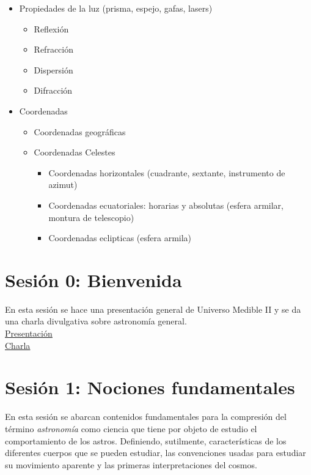 \documentclass[10pt,a4paper]{article}
\begin{document}
\begin{itemize}
\begin{itemize}
 \end{itemize}
\item Propiedades de la luz (prisma, espejo, gafas, lasers)
 \begin{itemize}
 \item Reflexión
 \item Refracción
 \item Dispersión 
 \item Difracción 
 \end{itemize}
\item Coordenadas 
 \begin{itemize}
  \item Coordenadas geográficas 
  \item Coordenadas Celestes
   \begin{itemize}
    \item Coordenadas horizontales (cuadrante, sextante, instrumento de azimut)
    \item Coordenadas ecuatoriales: horarias y absolutas (esfera armilar, montura de telescopio)
    \item Coordenadas eclipticas  (esfera armila)
   \end{itemize}
 \end{itemize}
\end{itemize}


\section{Sesión 0: Bienvenida}
En esta sesión se hace una presentación general de Universo Medible II y se da una charla divulgativa sobre astronomía general. \\ 

\href{https://github.com/miguelta281/Universo_Medible_II/blob/master/Presentaciones/Sesiones/Bienvenida/Bienvenida.pdf}{\underline{Presentación}} \\

\href{https://github.com/miguelta281/Universo_Medible_II/blob/master/Presentaciones/Sesiones/Bienvenida/Charla_bienvenida/Fetu.pdf}{\underline{Charla}} 
\section{Sesión 1: Nociones fundamentales}
En esta sesión se abarcan contenidos fundamentales para la compresión del término \textit{astronomía} como ciencia que tiene por objeto de estudio el comportamiento de los astros. Definiendo, sutilmente, características de los diferentes cuerpos que se pueden estudiar, las convenciones usadas para estudiar su movimiento aparente y las primeras interpretaciones del cosmos.\\
\end{document}
